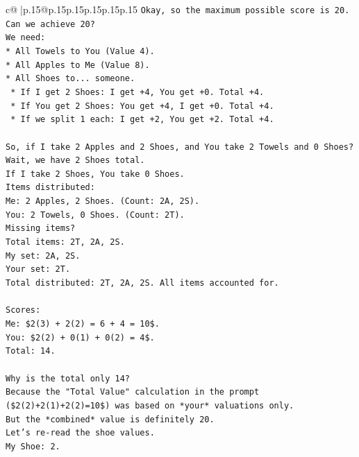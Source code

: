 \documentclass{article}
\begin{document}
{\begin{supertabular}{c@{$\;$}|p{.15\linewidth}@{}p{.15\linewidth}p{.15\linewidth}p{.15\linewidth}p{.15\linewidth}p{.15\linewidth}}
{{{\texttt{Okay, so the maximum possible score is 20.} \\
\texttt{Can we achieve 20?} \\
\texttt{We need:} \\
\texttt{*   All Towels to You (Value 4).} \\
\texttt{*   All Apples to Me (Value 8).} \\
\texttt{*   All Shoes to... someone.} \\
\texttt{    *   If I get 2 Shoes: I get +4, You get +0. Total +4.} \\
\texttt{    *   If You get 2 Shoes: You get +4, I get +0. Total +4.} \\
\texttt{    *   If we split 1 each: I get +2, You get +2. Total +4.} \\
\\ 
\texttt{So, if I take 2 Apples and 2 Shoes, and You take 2 Towels and 0 Shoes?} \\
\texttt{Wait, we have 2 Shoes total.} \\
\texttt{If I take 2 Shoes, You take 0 Shoes.} \\
\texttt{Items distributed:} \\
\texttt{Me: 2 Apples, 2 Shoes. (Count: 2A, 2S).} \\
\texttt{You: 2 Towels, 0 Shoes. (Count: 2T).} \\
\texttt{Missing items?} \\
\texttt{Total items: 2T, 2A, 2S.} \\
\texttt{My set: 2A, 2S.} \\
\texttt{Your set: 2T.} \\
\texttt{Total distributed: 2T, 2A, 2S. All items accounted for.} \\
\\ 
\texttt{Scores:} \\
\texttt{Me: \$2(3) + 2(2) = 6 + 4 = 10\$.} \\
\texttt{You: \$2(2) + 0(1) + 0(2) = 4\$.} \\
\texttt{Total: 14.} \\
\\ 
\texttt{Why is the total only 14?} \\
\texttt{Because the "Total Value" calculation in the prompt (\$2(2)+2(1)+2(2)=10\$) was based on *your* valuations only.} \\
\texttt{But the *combined* value is definitely 20.} \\
\texttt{Let's re{-}read the shoe values.} \\
\texttt{My Shoe: 2.} \\
}}}
\end{supertabular}}
\end{document}
